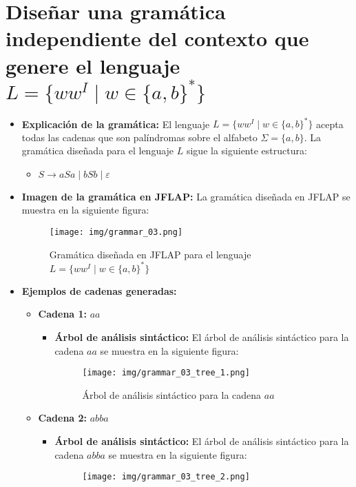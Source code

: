 \documentclass[11pt]{report}
\begin{document}
\newpage

\section{Diseñar una gramática independiente del contexto que genere el lenguaje \texorpdfstring{$L = \{ww^I \mid w \in \{a, b\}^*\}$}{L = \{ww^I | w ∈ \{a, b\}^*\}}}
\begin{itemize}
  \item \textbf{Explicación de la gramática:} El lenguaje $L = \{ww^I \mid w \in \{a, b\}^*\}$ acepta todas las cadenas que son palíndromas sobre el alfabeto $\Sigma = \{a, b\}$. La gramática diseñada para el lenguaje $L$ sigue la siguiente estructura:
  \begin{itemize}
    \item $S \rightarrow aSa \mid bSb \mid \varepsilon$
  \end{itemize}
  \item \textbf{Imagen de la gramática en JFLAP:} La gramática diseñada en JFLAP se muestra en la siguiente figura:
  \begin{figure}[H]
    \centering
    \texttt{[image: img/grammar\_03.png]}
    \caption{Gramática diseñada en JFLAP para el lenguaje $L = \{ww^I \mid w \in \{a, b\}^*\}$}
  \end{figure}
  \item \textbf{Ejemplos de cadenas generadas:}
  \begin{itemize}
    \item \textbf{Cadena 1:} $aa$
    \begin{itemize}
      \item \textbf{Árbol de análisis sintáctico:} El árbol de análisis sintáctico para la cadena $aa$ se muestra en la siguiente figura:
      \begin{figure}[H]
        \centering
        \texttt{[image: img/grammar\_03\_tree\_1.png]}
        \caption{Árbol de análisis sintáctico para la cadena $aa$}
        \label{fig:arbol7}
      \end{figure}
    \end{itemize}
    \item \textbf{Cadena 2:} $abba$
    \begin{itemize}
      \item \textbf{Árbol de análisis sintáctico:} El árbol de análisis sintáctico para la cadena $abba$ se muestra en la siguiente figura:
      \begin{figure}[H]
        \centering
        \texttt{[image: img/grammar\_03\_tree\_2.png]}

\end{figure}
\end{itemize}
\end{itemize}
\end{itemize}
\end{document}

